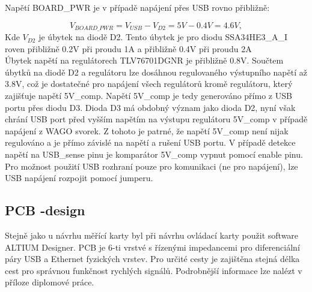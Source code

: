    Napětí BOARD\_PWR je v případě napájení přes USB rovno přibližně:
    
    \begin{equation}
        V_{BOARD\_PWR} = V_{USB} - V_{D2} = 5V - 0.4V = 4.6V,
    \end{equation}
    Kde $V_{D2}$ je úbytek na diodě D2. Tento úbytek je pro diodu SSA34HE3\_A\_I roven přibližně 0.2V při proudu 1A
    a přibližně 0.4V při proudu 2A\\

    Úbytek napětí na regulátorech TLV76701DGNR je přibližně 0.8V.
    Součtem úbytků na diodě D2 a regulátoru lze 
    dosáhnou regulovaného výstupního napětí až 3.8V, což je dostatečné pro napájení všech regulátorů
    kromě regulátoru, který zajišťuje napětí 5V\_comp. Napětí 5V\_comp je tedy generováno přímo z USB portu přes 
    diodu D3. Dioda D3 má obdobný význam jako dioda D2, nyní však chrání USB port před vyšším napětím na výstupu
    regulátoru 5V\_comp v případě napájení z WAGO svorek. Z tohoto je patrné, že napětí 5V\_comp není nijak regulováno
    a je přímo závislé na napětí a rušení USB portu.
    V případě detekce napětí na USB\_sense pinu je komparátor 5V\_comp vypnut pomocí enable pinu.\\

    Pro možnost použití USB rozhraní pouze pro komunikaci (ne pro napájení),
    lze USB napájení rozpojit pomocí jumperu.\\


    \subsection{PCB -design}
   Stejně jako u návrhu měřící karty byl při návrhu ovládací karty použit software ALTIUM Designer.
   PCB je 6-ti vrstvé s řízenými impedancemi pro diferenciální páry USB a Ethernet fyzických vrstev.
   Pro určité cesty je zajištěna stejná délka cest pro správnou funkčnost rychlých signálů.
   Podrobnější informace lze nalézt v příloze diplomové práce.\\

